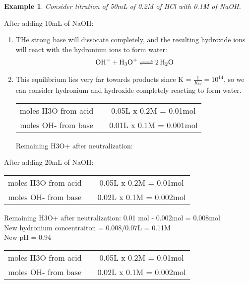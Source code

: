 \documentclass{article}  %
\newtheorem{exmp}{Example}
\begin{document}
\begin{exmp}
    Consider titration of 50mL of 0.2M of HCl with 0.1M of NaOH.
\end{exmp}
After adding 10mL of NaOH:
\begin{enumerate}
    \item THe strong base will dissocate completely, and the resulting hydroxide ions will react with the hydronium ions to form water:
    \begin{equation*}
        \begin{aligned}
            \ce{OH- + H3O+ <=> 2H2O}
        \end{aligned}
    \end{equation*}
    \item This equilibrium lies very far towards products since K = $\frac{1}{K_W} = 10^{14}$, so we can consider hydronium and hydroxide completely reacting to form water.
    \newline
    \begin{tabular}{c@{}c@{}c@{}}
        moles H3O from acid && 0.05L x 0.2M = 0.01mol \\
        moles OH- from base && 0.01L x 0.1M = 0.001mol \\
    \end{tabular}
    \newline
    Remaining H3O+ after neutralization:
\end{enumerate}
After adding 20mL of NaOH:
\begin{tabular}{c@{}c@{}c@{}}
    moles H3O from acid && 0.05L x 0.2M = 0.01mol \\
    moles OH- from base && 0.02L x 0.1M = 0.002mol \\
\end{tabular}
Remaining H3O+ after neutralization: 0.01 mol - 0.002mol = 0.008mol \\
New hydronium concentraiton =  0.008/0.07L = 0.11M \\
New pH = 0.94 \\
\newline
\begin{tabular}{c@{}c@{}c@{}}
    moles H3O from acid && 0.05L x 0.2M = 0.01mol \\
    moles OH- from base && 0.02L x 0.1M = 0.002mol \\
\end{tabular}
\newline
\end{document}
